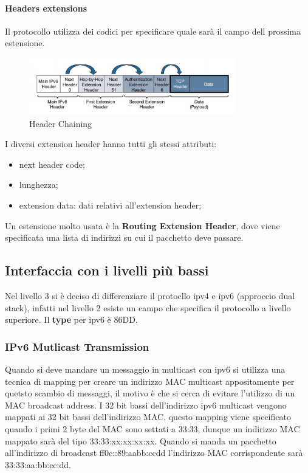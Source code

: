 \documentclass[12pt]{article}
\begin{document}
\paragraph{Headers extensions}
Il protocollo utilizza dei codici per specificare quale sar\`a il campo dell prossima estensione.
\begin{figure}[H]
    \centering
    \includegraphics[width=0.8\textwidth]{header-chaining.png}
    \caption{Header Chaining}
    \label{fig:header-chaining}
\end{figure}
I diversi extension header hanno tutti gli stessi attributi:
\begin{itemize}
    \item next header code;
    \item lunghezza;
    \item extension data: dati relativi all'extension header;
\end{itemize}
Un estensione molto usata \`e la \textbf{Routing Extension Header}, dove viene specificata una lista di indirizzi su cui il pacchetto deve passare.


\subsection{Interfaccia con i livelli pi\`u bassi}
Nel livello 3 si \`e deciso di differenziare il protocllo ipv4 e ipv6 (approccio dual stack), infatti nel livello 2 esiste un campo che specifica il protocollo a livello superiore. Il \textbf{type} per ipv6 \`e 86DD.

\subsubsection{IPv6 Mutlicast Transmission}
Quando si deve mandare un messaggio in multicast con ipv6 si utilizza una tecnica di mapping per creare un indirizzo MAC multicast appositamente per quetsto scambio di messaggi, il motivo \`e che si cerca di evitare l'utilizzo di un MAC broadcast address. I 32 bit bassi dell'indirizzo ipv6 multicast vengono mappati ai 32 bit bassi dell'indirizzo MAC, questo mapping viene specificato quando i primi 2 byte del MAC sono settati a 33:33, dunque un indirizzo MAC mappato sar\`a del tipo 33:33:xx:xx:xx:xx. Quando si manda un pacchetto all'indirizzo di broadcast ff0c::89:aabb:ccdd l'indirizzo MAC corrispondente sar\`a 33:33:aa:bb:cc:dd.
\end{document}
